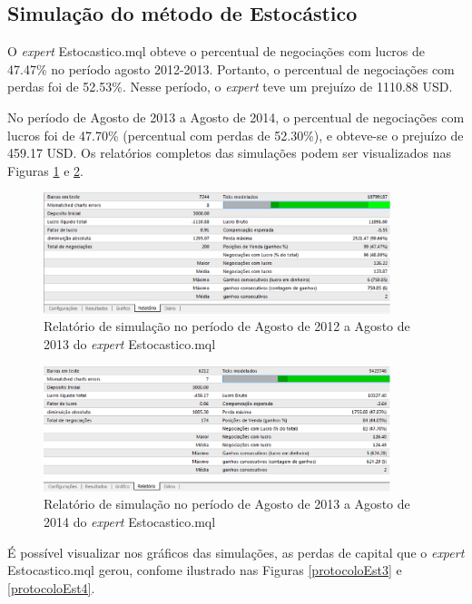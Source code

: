 \subsection{Simulação do método de Estocástico}

O \textit{expert} Estocastico.mql obteve o percentual de negociações com lucros de 47.47\% no período agosto 2012-2013. Portanto, o percentual de negociações com perdas foi de 52.53\%. Nesse período, o \textit{expert} teve um prejuízo de 1110.88 USD.

No período de Agosto de 2013 a Agosto de 2014, o percentual de negociações com lucros foi de 47.70\% (percentual com perdas de 52.30\%),  e obteve-se o prejuízo de 459.17 USD. 
Os relatórios completos das simulações podem ser visualizados nas Figuras \ref{protocoloEst} e \ref{protocoloEst2}.

\begin{figure}[H]
\centering
\includegraphics[width=0.9\textwidth]{figuras/protocoloEst}
\caption{Relatório de simulação no período de Agosto de 2012 a Agosto de 2013 do \textit{expert} Estocastico.mql}
\label{protocoloEst}
\end{figure}

\begin{figure}[H]
\centering
\includegraphics[width=0.9\textwidth]{figuras/protocoloEst2}
\caption{Relatório de simulação no período de Agosto de 2013 a Agosto de 2014 do \textit{expert} Estocastico.mql}
\label{protocoloEst2}
\end{figure}

É possível visualizar nos gráficos das simulações, as perdas de capital que o \textit{expert} Estocastico.mql gerou, confome ilustrado nas Figuras \ref{protocoloEst3} e \ref{protocoloEst4}.

